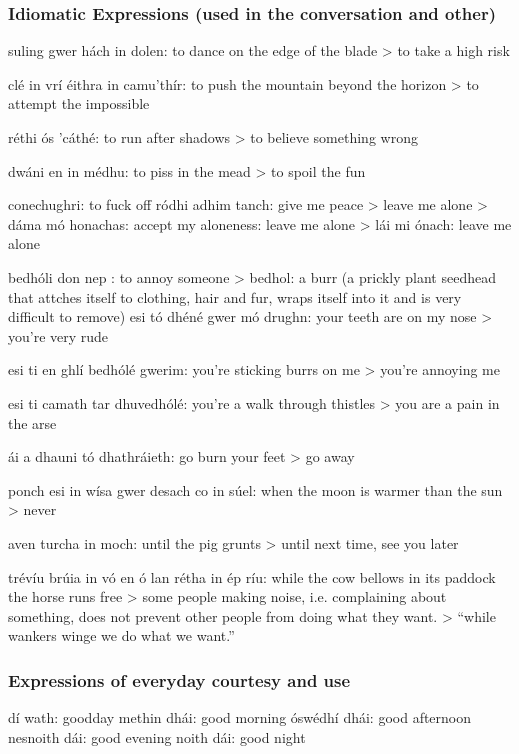 \subsubsection{Idiomatic Expressions (used in the conversation and other)}

suling gwer h\'{a}ch in dolen: to dance on the edge of the blade
> to take a high risk

cl\'{e} in vr\'{i} \'{e}ithra in camu'th\'{i}r: to push the mountain beyond the horizon
> to attempt the impossible

r\'{e}thi \'{o}s 'c\'{a}th\'{e}: to run after shadows
> to believe something wrong

dw\'{a}ni en in m\'{e}dhu: to piss in the mead
> to spoil the fun

conechughri: to fuck off
r\'{o}dhi adhim tanch: give me peace > leave me alone
> d\'{a}ma m\'{o} honachas: accept my aloneness: leave me alone
> l\'{a}i mi \'{o}nach: leave me alone

bedh\'{o}li don nep : to annoy someone
> bedhol: a burr (a prickly plant seedhead that attches itself to clothing, hair and fur, wraps itself into it and is very difficult to remove) esi t\'{o} dh\'{e}n\'{e} gwer m\'{o} drughn: your teeth are on my nose 
> you're very rude

esi ti en ghl\'{i} bedh\'{o}l\'{e} gwerim: you're sticking burrs on me
> you're annoying me

esi ti camath tar dhuvedh\'{o}l\'{e}: you're a walk through thistles
> you are a pain in the arse

\'{a}i a dhauni t\'{o} dhathr\'{a}ieth: go burn your feet
> go away

ponch esi in w\'{i}sa gwer desach co in s\'{u}el: when the moon is warmer than the sun
> never

aven turcha in moch: until the pig grunts
> until next time, see you later

tr\'{e}v\'{i}u br\'{u}ia in v\'{o} en \'{o} lan r\'{e}tha in \'{e}p r\'{i}u: while the cow bellows in its paddock the horse runs free
> some people making noise, i.e. complaining about something, does not prevent other people from doing what they want. > ``while wankers winge we do what we want.''

\subsubsection{Expressions of everyday courtesy and use}

d\'{i} wath: goodday
methin dh\'{a}i: good morning
\'{o}sw\'{e}dh\'{i} dh\'{a}i: good afternoon
nesnoith d\'{a}i: good evening
noith d\'{a}i: good night

